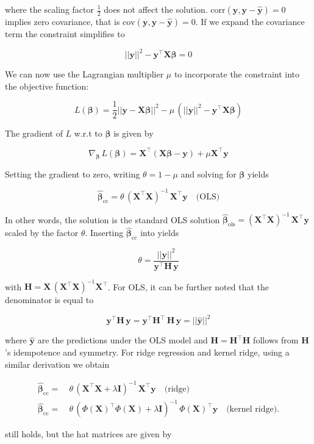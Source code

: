 \documentclass[utf8]{frontiersSCNS} %
\renewcommand{\a}{\theta}
\renewcommand{\b}{\boldsymbol{\beta}} %
\newcommand{\bcc}{\boldsymbol{\hat{\beta}}_\text{cc}} %
\newcommand{\bOLS}{\boldsymbol{\hat{\beta}}_\text{ols}}
\newcommand{\corr}{\text{corr}}
\renewcommand{\H}{\mathbf{H}}
\newcommand{\I}{\mathbf{I}}
\newcommand{\X}{\mathbf{X}}
\newcommand{\y}{\mathbf{y}}
\newcommand{\yh}{\mathbf{\hat{y}}}
\begin{document}
where the scaling factor $\frac{1}{2}$ does not affect the solution.   $\corr(\y,\y-\yh) = 0$ implies zero covariance, that is $\text{cov}(\y,\y-\yh) = 0$. If we expand the covariance term the constraint  simplifies to 

\begin{equation}\label{eq:zero_constraint}
||\y||^2 - \y^\top\X\b = 0
\end{equation}

We can now use the Lagrangian multiplier $\mu$ to incorporate the constraint into the objective function:

\[
L(\b) = \frac{1}{2}||\y - \X\b||^2 - \mu\,(||\y||^2 - \y^\top\X\b)
\]

The gradient of $L$ w.r.t to $\b$ is given by

\[
\nabla_{\b}\, L(\b) = \X^\top(\X\b-\y) + \mu \X^\top\y
\]

Setting the gradient to zero, writing $\a = 1-\mu$ and solving for $\b$ yields 

\[
\bcc = \a\,(\X^\top\X)^{-1}\,\X^\top\y\quad\text{(OLS)}
\]

In other words, the solution is the standard OLS solution $\bOLS = (\X^\top\X)^{-1}\,\X^\top\y$ scaled by the factor $\a$. Inserting $\bcc$ into  yields

\begin{equation}\label{eq:a_solution_appendix}
\a = \frac{||\y||^2}{\y^\top\H\,\y}
\end{equation}

with $\H = \X\,(\X^\top\X)^{-1}\X^\top$. For OLS, it can be further noted that the denominator is equal to 

\[
\y^\top\H\,\y = \y^\top\H^\top\,\H\,\y = ||\yh||^2
\]

where $\yh$ are the predictions under the OLS model and $\H=\H^\top\H$ follows from $\H$'s idempotence and symmetry. For ridge regression and kernel ridge, using a similar derivation we obtain 

\begin{equation*}
\begin{split}
\bcc =&\ \a\,(\X^\top\X + \lambda\I)^{-1}\,\X^\top\y\quad\text{(ridge)}\\
\bcc =&\ \a\,(\Phi(\X)^\top\Phi(\X) + \lambda\I)^{-1}\,\Phi(\X)^\top\y\quad\text{(kernel ridge)}.
\end{split}
\end{equation*}

 still holds, but the hat matrices are given by
\end{document}

